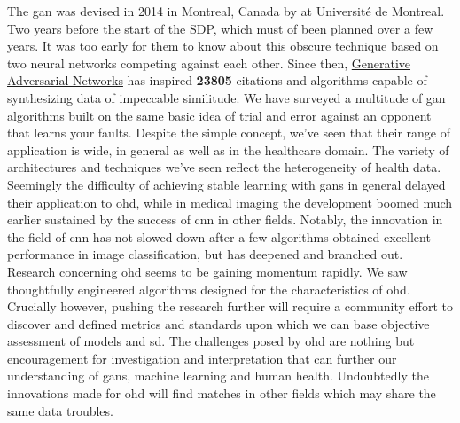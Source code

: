 The \gls{gan} was devised in 2014 in Montreal, Canada by \citeauthor{goodgan} at Université de Montreal. Two years before the start of the SDP, which must of been planned over a few years. It was too early for them to know about this obscure technique based on two neural networks competing against each other. Since then, \href{http://papers.nips.cc/paper/5423-generative-adversarial-nets}{Generative Adversarial Networks} \cite{goodgan} has inspired \textbf{23805} citations and algorithms capable of synthesizing data of impeccable similitude. We have surveyed a multitude of \gls{gan} algorithms built on the same basic idea of trial and error against an opponent that learns your faults. Despite the simple concept, we've seen that their range of application is wide, in general as well as in the healthcare domain. The variety of architectures and techniques we've seen reflect the heterogeneity of health data. Seemingly the difficulty of achieving stable learning with \glspl{gan} in general delayed their application to \gls{ohd}, while in medical imaging the development boomed much earlier sustained by the success of \gls{cnn} in other fields. Notably, the innovation in the field of \gls{cnn} has not slowed down after a few algorithms obtained excellent performance in image classification, but has deepened and branched out. Research concerning \gls{ohd} seems to be gaining momentum rapidly. We saw thoughtfully engineered algorithms designed for the characteristics of \gls{ohd}. Crucially however, pushing the research further will require a community effort to discover and defined metrics and standards upon which we can base objective assessment of models and \gls{sd}. The challenges posed by \gls{ohd} are nothing but encouragement for investigation and interpretation that can further our understanding of \glspl{gan}, machine learning and human health. Undoubtedly the innovations made for \gls{ohd} will find matches in other fields which may share the same data troubles. 
\pagebreak